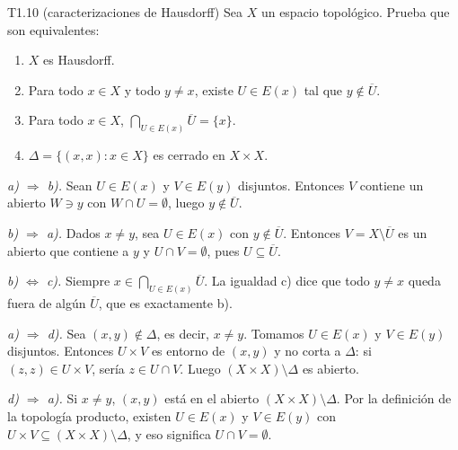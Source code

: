 \begin{ejercicio}{T1.10 (caracterizaciones de Hausdorff)}
Sea $X$ un espacio topológico. Prueba que son equivalentes:
\begin{enumerate}
    \item[a)] $X$ es Hausdorff.
    \item[b)] Para todo $x \in X$ y todo $y \neq x$, existe $U \in E(x)$ tal que $y \notin \overline{U}$.
    \item[c)] Para todo $x \in X$, $\bigcap_{U \in E(x)} \overline{U} = \{x\}$.
    \item[d)] $\Delta = \{(x,x) : x \in X\}$ es cerrado en $X \times X$.
\end{enumerate}

\sol \fuentepropia

\emph{a) $\Rightarrow$ b).} Sean $U \in E(x)$ y $V \in E(y)$ disjuntos. Entonces $V$ contiene un abierto $W \ni y$ con $W \cap U = \emptyset$, luego $y \notin \overline{U}$.

\emph{b) $\Rightarrow$ a).} Dados $x \neq y$, sea $U \in E(x)$ con $y \notin \overline{U}$. Entonces $V = X \setminus \overline{U}$ es un abierto que contiene a $y$ y $U \cap V = \emptyset$, pues $U \subseteq \overline{U}$.

\emph{b) $\Leftrightarrow$ c).} Siempre $x \in \bigcap_{U \in E(x)} \overline{U}$. La igualdad c) dice que todo $y \neq x$ queda fuera de algún $\overline{U}$, que es exactamente b).

\emph{a) $\Rightarrow$ d).} Sea $(x,y) \notin \Delta$, es decir, $x \neq y$. Tomamos $U \in E(x)$ y $V \in E(y)$ disjuntos. Entonces $U \times V$ es entorno de $(x,y)$ y no corta a $\Delta$: si $(z,z) \in U \times V$, sería $z \in U \cap V$. Luego $(X \times X) \setminus \Delta$ es abierto.

\emph{d) $\Rightarrow$ a).} Si $x \neq y$, $(x,y)$ está en el abierto $(X \times X) \setminus \Delta$. Por la definición de la topología producto, existen $U \in E(x)$ y $V \in E(y)$ con $U \times V \subseteq (X \times X) \setminus \Delta$, y eso significa $U \cap V = \emptyset$.
\end{ejercicio}

